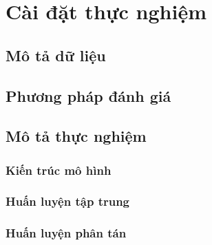 \chapter{Cài đặt thực nghiệm}
\label{Chapter4}

\section{Mô tả dữ liệu}


\section{Phương pháp đánh giá}

\section{Mô tả thực nghiệm}

\subsection{Kiến trúc mô hình}

\subsection{Huấn luyện tập trung}

\subsection{Huấn luyện phân tán}

